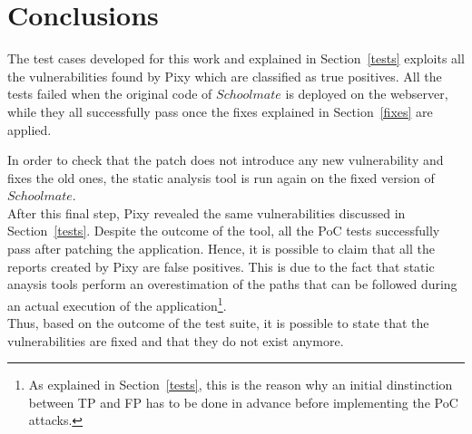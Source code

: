 \documentclass{sig-alternate-05-2015}
\begin{document}
\section{Conclusions}\label{outcomes}
The test cases developed for this work and explained in Section~\ref{tests} exploits all the
vulnerabilities found by Pixy which are classified as true positives. All the tests failed when
the original code of $Schoolmate$ is deployed on the webserver, while they all successfully pass
once the fixes explained in Section~\ref{fixes} are applied.

In order to check that the patch does not introduce any new vulnerability and fixes the old ones,
the static analysis tool is run again on the fixed version of $Schoolmate$.\\
After this final step, Pixy revealed the same vulnerabilities discussed in Section~\ref{tests}.
Despite the outcome of the tool, all the PoC tests successfully pass after patching the application.
Hence, it is possible to claim that all the reports created by Pixy are false positives.
This is due to the fact that static anaysis
tools perform an overestimation of the paths that can be followed during an actual execution
of the application\footnote{As explained in Section~\ref{tests}, this is the reason why an initial
dinstinction between TP and FP has to be done in advance before implementing the PoC attacks.}.\\
Thus, based on the outcome of the test suite, it is possible to state that the vulnerabilities are
fixed and that they do not exist anymore.
\end{document}
